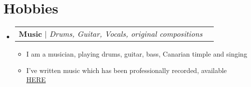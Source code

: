 \documentclass[letterpaper,11pt]{article}
\makeatletter
\newcommand{\resumeItem}[1]{
  \item\small{
    {#1 \vspace{-2pt}}
  }
}
\newcommand{\resumeProjectHeading}[2]{
    \item
    \begin{tabular*}{0.97\textwidth}{l@{\extracolsep{\fill}}r}
      \small#1 & #2 \\
    \end{tabular*}\vspace{-7pt}
}
\newcommand{\resumeSubHeadingListStart}{\begin{itemize}[leftmargin=0.15in, label={}]}
\newcommand{\resumeSubHeadingListEnd}{\end{itemize}}
\newcommand{\resumeItemListStart}{\begin{itemize}}
\newcommand{\resumeItemListEnd}{\end{itemize}\vspace{-5pt}}
\makeatother
\begin{document}
\section{Hobbies}
\resumeSubHeadingListStart
    \resumeProjectHeading
          {\textbf{Music} $|$ \emph{Drums, Guitar, Vocals, original compositions}}{}
          \resumeItemListStart
            \resumeItem{I am a musician, playing drums, guitar, bass, Canarian timple and singing}
            \resumeItem{I've written music which has been professionally recorded, available \href{https://open.spotify.com/artist/6vROqVU2bVHOp3V4q09ljN?si=0pgR7wFLS8CgVicZ_6a1GQ}{\underline{HERE}}}
          \resumeItemListEnd
    \resumeSubHeadingListEnd

%
\end{document}
